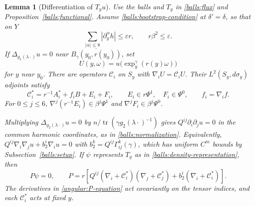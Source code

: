 \documentclass[11pt,a4paper]{article}
\newtheorem{lemma}[theorem]{Lemma}
\theoremstyle{definition}
\theoremstyle{remark}
\newcommand{\eps}{\varepsilon}
\numberwithin{equation}{section}
\begin{document}
\begin{lemma}[Differentiation of $T_yu$]\label{angular:trace}
Use the balls and $T_y$ in \eqref{balls:flux} and
Proposition~\ref{balls:functional}. Assume \eqref{balls:bootstrap-condition}
at $\delta'=\delta$, so that on $Y$
\begin{equation}\label{angular:smallness}
 \sum_{|\alpha|\le8}|\partial_y^\alpha h|\le\eps r,
 \qquad r\beta^2\le\eps.
\end{equation}
If $\Delta_{g_1(\lambda\cdot)}u=0$ near
$\overline{B_\gamma(y_0,r(y_0))}$, set
\[
 U(y,\omega)=u\bigl(\exp_y^\gamma(r(y)\omega)\bigr)
\]
for $y$ near $y_0$. There are operators $\mathcal C_i$ on $S_y$ with
$\nabla_iU=\mathcal C_iU$. Their $L^2(S_y,d\sigma_y)$ adjoints satisfy
\begin{equation}\label{angular:C-expansion}
 \mathcal C_i^*=r^{-1}A_i^*+f_iB+E_i+F_i,
 \qquad E_i\in r\Psi^1,\quad F_i\in\Psi^0,
 \qquad f_i=\nabla_i f.
\end{equation}
For $0\le j\le6$, $\nabla^j(r^{-1}E_i)\in\beta^j\Psi^1$ and
$\nabla^j F_i\in\beta^j\Psi^0$.

Multiplying $\Delta_{g_2(\lambda\cdot)}u=0$ by
$n/\operatorname{tr}(\gamma g_2(\lambda\cdot)^{-1})$ gives
$Q^{ij}\partial_i\partial_j u=0$ in the common harmonic coordinates,
as in \eqref{balls:normalization}. Equivalently,
$Q^{ij}\nabla_i\nabla_j u+b_2^i\nabla_i u=0$ with
$b_2^k=Q^{ij}\Gamma^k_{ij}(\gamma)$, which has uniform $C^m$ bounds
by Subsection~\ref{balls:setup}. If $\psi$ represents $T_y$ as in
\eqref{balls:density-representation}, then
\begin{equation}\label{angular:P-equation}
 P\psi=0,\qquad
 P=r\left[Q^{ij}(\nabla_i+\mathcal C_i^*)
                    (\nabla_j+\mathcal C_j^*)
             +b_2^i(\nabla_i+\mathcal C_i^*)\right].
\end{equation}
The derivatives in \eqref{angular:P-equation} act covariantly on
the tensor indices, and each $\mathcal C_i^*$ acts at fixed $y$.
\end{lemma}
\end{document}
